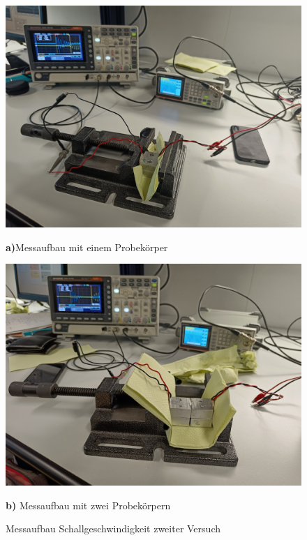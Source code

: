 \begin{figure}[h]
    \begin{minipage}[b]{.50\linewidth} %
       \includegraphics[width=\linewidth]{image/charakterisierung.jpg}
       \caption*{\textbf{a)}Messaufbau mit einem Probekörper}
    \end{minipage}
    \hspace{.01\linewidth}%
    \begin{minipage}[b]{.5\linewidth} %
       \includegraphics[width=\linewidth]{image/laufzeitmessung.jpg}
       \caption*{\textbf{b)} Messaufbau mit zwei Probekörpern}
    \end{minipage}
    \caption{Messaufbau Schallgeschwindigkeit zweiter Versuch}
    \label{img:Schall}
 \end{figure}





